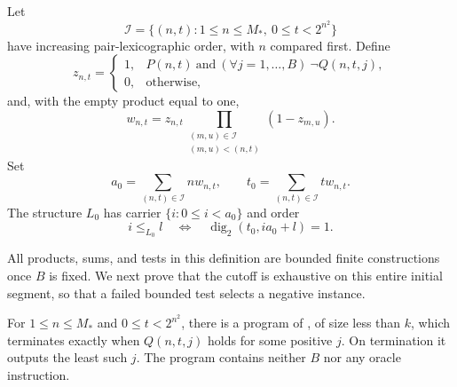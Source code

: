 \begin{definition}\label{q:minimum-table}
Let
\[
 \mathcal I=\{(n,t):1\le n\le M_*,\ 0\le t<2^{n^2}\}
\]
have increasing pair-lexicographic order, with $n$ compared first.
Define
\begin{equation}\label{q:selection-z}
 z_{n,t}=\begin{cases}
  1,& P(n,t)\ \text{and}\ (\forall j=1,\ldots,B)\ \neg Q(n,t,j),\\
  0,&\text{otherwise},
 \end{cases}
\end{equation}
and, with the empty product equal to one,
\begin{equation}\label{q:selection-w}
        w_{n,t}=z_{n,t}
                \prod_{\substack{(m,u)\in\mathcal I\\(m,u)<(n,t)}}
                              (1-z_{m,u}).
\end{equation}
Set
\begin{equation}\label{q:a0t0}
       a_0=\sum_{(n,t)\in\mathcal I}n w_{n,t},\qquad
       t_0=\sum_{(n,t)\in\mathcal I}t w_{n,t}.
\end{equation}
The structure $L_0$ has carrier $\{i:0\le i<a_0\}$ and order
\begin{equation}\label{q:minimum-order}
               i\le_{L_0}l\quad\Longleftrightarrow\quad
                    \operatorname{dig}_2(t_0,ia_0+l)=1.
\end{equation}
\end{definition}

All products, sums, and tests in this definition are bounded finite
constructions once $B$ is fixed.  We next prove that the cutoff is
exhaustive on this entire initial segment, so that a failed bounded
test selects a negative instance.

\begin{lemma}\label{q:search-size}
For $1\le n\le M_*$ and $0\le t<2^{n^2}$, there is a program of
, of size less than $k$, which terminates
exactly when $Q(n,t,j)$ holds for some positive $j$.  On termination
it outputs the least such $j$.  The program contains neither $B$ nor
any oracle instruction.
\end{lemma}

